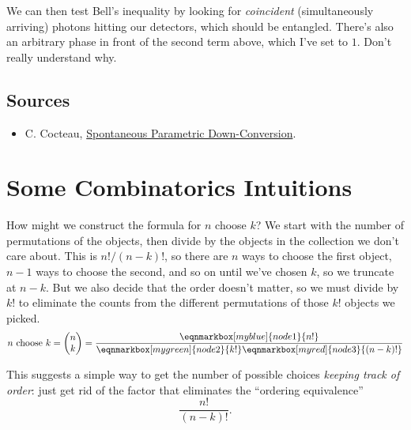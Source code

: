 \documentclass{report}
\begin{document}
We can then test Bell's inequality by looking for \textit{coincident}
(simultaneously arriving) photons hitting our detectors, which should be entangled. 
{\color{myred} There's also an arbitrary phase in front of the second term above, 
which I've set to $ 1 $. Don't really understand why.}

\subsection*{Sources}
\begin{itemize}
	\item C. Cocteau, \href{https://arxiv.org/abs/1809.00127}{Spontaneous Parametric Down-Conversion}.
\end{itemize}

\section{Some Combinatorics Intuitions}
 How might we construct the formula for $ n $
choose $ k $? We start with the number of permutations of the objects, then 
divide by the objects in the collection we don't care about. This is $ n!/(n-k)! $, 
so there are $ n $ ways to choose the first object, $ n-1 $ ways to choose the 
second, and so on until we've chosen $ k $, so we truncate at $ n-k $. But we also 
decide that the order doesn't matter, so we must divide by $ k! $ to eliminate 
the counts from the different permutations of those $ k! $ objects we picked.
\vspace*{2em}
\begin{equation*}
n \text{ choose } k = 
\begin{pmatrix}
n \\ k 
\end{pmatrix}	
= 
\frac{\eqnmarkbox[myblue]{node1}{n!}}{\eqnmarkbox[mygreen]{node2}{k!} \eqnmarkbox[myred]{node3}{(n-k)!}}
\end{equation*}
\medskip

 This suggests a simple way to get
the number of possible choices \textit{keeping track of order}: just get 
rid of the factor that eliminates the ``ordering equivalence''
\begin{equation*}
	\frac{n!}{(n-k)!}.
\end{equation*}
\end{document}
